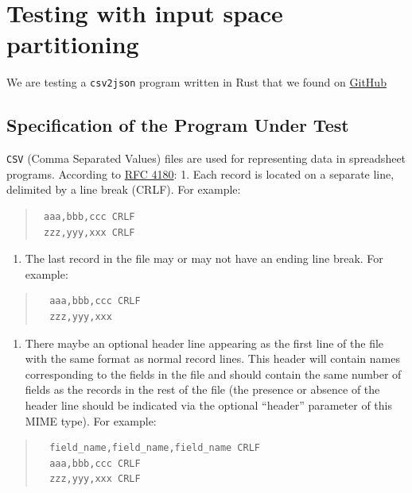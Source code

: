 \documentclass[
]{article}
\author{}
\date{}
\providecommand{\tightlist}{%
  \setlength{\itemsep}{0pt}\setlength{\parskip}{0pt}}
\begin{document}
\section{Testing with input space
partitioning}\label{testing-with-input-space-partitioning}

We are testing a \texttt{csv2json} program written in Rust that we found on 
\href{https://github.com/benkay86/csv2json}{GitHub}
\subsection{Specification of the Program Under Test}
\texttt{CSV} (Comma Separated
Values) files are used for representing data in spreadsheet programs.
According to
\href{https://www.rfc-editor.org/info/rfc4180/\#section-2}{RFC 4180}: 1.
Each record is located on a separate line, delimited by a line break
(CRLF). For example:

\begin{quote}
\begin{verbatim}
 aaa,bbb,ccc CRLF
 zzz,yyy,xxx CRLF
\end{verbatim}
\end{quote}

\begin{enumerate}
\def\labelenumi{\arabic{enumi}.}
\setcounter{enumi}{1}
\tightlist
\item
  The last record in the file may or may not have an ending line break.
  For example:
\end{enumerate}

\begin{quote}
\begin{verbatim}
  aaa,bbb,ccc CRLF
  zzz,yyy,xxx
\end{verbatim}
\end{quote}

\begin{enumerate}
\def\labelenumi{\arabic{enumi}.}
\setcounter{enumi}{2}
\tightlist
\item
  There maybe an optional header line appearing as the first line of the
  file with the same format as normal record lines. This header will
  contain names corresponding to the fields in the file and should
  contain the same number of fields as the records in the rest of the
  file (the presence or absence of the header line should be indicated
  via the optional ``header'' parameter of this MIME type). For example:
\end{enumerate}

\begin{quote}
\begin{verbatim}
  field_name,field_name,field_name CRLF
  aaa,bbb,ccc CRLF
  zzz,yyy,xxx CRLF
\end{verbatim}
\end{quote}
\end{document}
